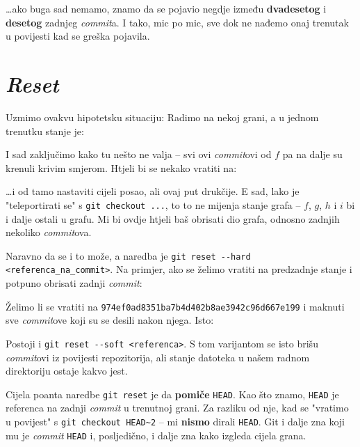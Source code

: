 
\dots{}ako buga sad nemamo, znamo da se pojavio negdje između \textbf{dvadesetog} i \textbf{desetog} zadnjeg \emph{commit}a.
I tako, mic po mic, sve dok ne nađemo onaj trenutak u povijesti kad se greška pojavila.

\section*{\emph{Reset}}

Uzmimo ovakvu hipotetsku situaciju: Radimo na nekoj grani, a u jednom trenutku stanje je:



I sad zaključimo kako tu nešto ne valja -- svi ovi \emph{commit}ovi od $f$ pa na dalje su krenuli krivim smjerom.
Htjeli bi se nekako vratiti na:



\dots{}i od tamo nastaviti cijeli posao, ali ovaj put drukčije.
E sad, lako je "teleportirati se" s \verb+git checkout ...+, to to ne mijenja stanje grafa -- $f$, $g$, $h$ i $i$ bi i dalje ostali u grafu.
Mi bi ovdje htjeli baš obrisati dio grafa, odnosno zadnjih nekoliko \emph{commit}ova.

Naravno da se i to može, a naredba je \verb+git reset --hard <referenca_na_commit>+.
Na primjer, ako se želimo vratiti na predzadnje stanje i potpuno obrisati zadnji \emph{commit}:


Želimo li se vratiti na \verb+974ef0ad8351ba7b4d402b8ae3942c96d667e199+ i maknuti sve \emph{commit}ove koji su se desili nakon njega.
Isto:


Postoji i \verb+git reset --soft <referenca>+. 
S tom varijantom se isto brišu \emph{commit}ovi iz povijesti repozitorija, ali stanje datoteka u našem radnom direktoriju ostaje kakvo jest.

Cijela poanta naredbe \verb+git reset+ je da \textbf{pomiče} \verb+HEAD+.
Kao što znamo, \verb+HEAD+ je referenca na zadnji \emph{commit} u trenutnoj grani.
Za razliku od nje, kad se "vratimo u povijest" s \verb+git checkout HEAD~2+ -- mi \textbf{nismo} dirali \verb+HEAD+.
Git i dalje zna koji mu je \emph{commit} \verb+HEAD+ i, posljedično, i dalje zna kako izgleda cijela grana.

